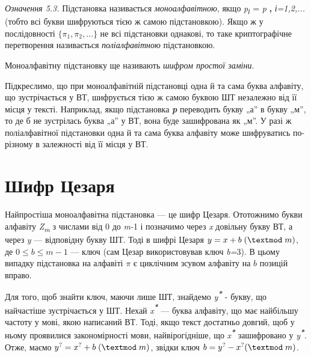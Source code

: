 {\textit{Означення 5.3.}\textit{ }Підстановка називається
\textit{моноалфавітною}, якщо\textbf{
}\textit{\textgreek{p}}\textit{\textsubscript{і}} =\textsf{\textit{
}}\textit{\textgreek{p}}\textbf{ , }\textit{і=1,2,...} (тобто всі букви
шифруються тією ж самою підстановкою). Якщо ж у послідовності   ${\{\pi
_{1},\pi _{2},\dots\}}$ не всі підстановки однакові, то
таке криптографічне перетворення називається \textit{поліалфавітною}
підстановкою.

Моноалфавітну підстановку ще називають \textit{шифром простої заміни}.

Підкреслимо, що при моноалфавітній підстановці одна й та сама буква алфавіту, що
зустрічається у ВТ, шифрується тією ж самою буквою ШТ незалежно від її місця у
тексті. Наприклад, якщо підстановка \textbf{\textit{\textgreek{p}}} переводить
букву „а” в  букву „м”, то де б не зустрілась буква „а” у ВТ, вона буде
зашифрована як „м”. У разі ж поліалфавітної підстановки одна й та сама буква
алфавіту може шифруватись по-різному в залежності від її місця у ВТ.


\bigskip


\bigskip

\section{Шифр Цезаря}


\bigskip


\bigskip

Найпростіша моноалфавітна підстановка --- це шифр Цезаря. Ототожнимо букви
алфавіту \textit{Z}\textit{\textsubscript{m}} з числами від\textbf{ }0 до
\textit{m-}1 і позначимо через \textit{x} довільну букву ВТ, а через \textit{y}
--- відповідну букву ШТ. Тоді в шифрі Цезаря   $y=x+b\;(\textmod\;m)$, де 
$0\le b\le m-1$ --- ключ (сам Цезар використовував ключ \textit{b}\textit{=}3).
В цьому випадку підстановка на алфавіті  $\pi $ є циклічним зсувом алфавіту
на  $b$ позицій вправо.

Для того, щоб знайти ключ, маючи лише ШТ, знайдемо
\textit{y}\textbf{\textit{\textsuperscript{*}}} - букву, що найчастіше
зустрічається у ШТ. Нехай \textit{x}\textbf{\textit{\textsuperscript{*}}} ---
буква алфавіту, що має найбільшу частоту у мові, якою написаний ВТ. Тоді, якщо
текст достатньо довгий, щоб у ньому проявилися закономірності мови,
найвірогідніше, що \textit{x}\textbf{\textit{\textsuperscript{*}}} зашифровано
у  \textit{y}\textbf{\textit{\textsuperscript{*}}}. Отже, маємо 
$y^{?}=x^{?}+b\;(\textmod\;m)$, звідки ключ 
$b=y^{?}-x^{?}(\textmod\;m)$.

}
